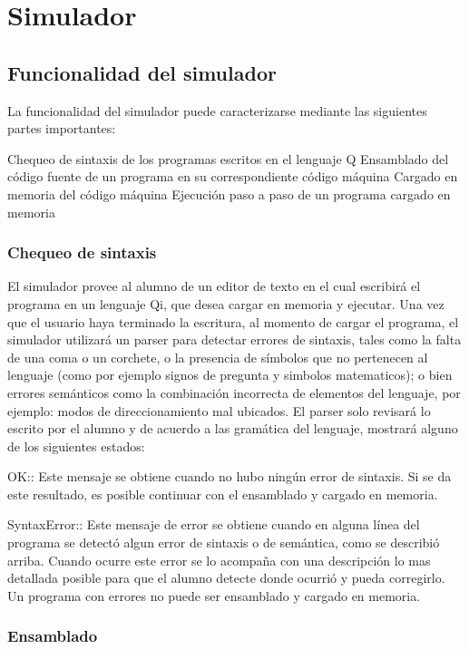 \chapter{Simulador \qsim}


\section{Funcionalidad del simulador}

La funcionalidad del simulador puede caracterizarse mediante las siguientes partes importantes:

Chequeo de sintaxis de los programas escritos en el lenguaje Q
Ensamblado del código fuente de un programa en su correspondiente código máquina
Cargado en memoria del código máquina
Ejecución paso a paso de un programa cargado en memoria

\subsection{Chequeo de sintaxis}

El simulador provee al alumno de un editor de texto en el cual escribirá el programa en un lenguaje Qi, que desea cargar en memoria y ejecutar.
Una vez que el usuario haya terminado la escritura, al momento de cargar el programa, el simulador utilizará un parser para detectar errores de sintaxis, tales como la falta de una coma o un corchete, o la presencia de símbolos que no pertenecen al lenguaje (como por ejemplo signos de pregunta y simbolos matematicos); o bien errores semánticos como la combinación incorrecta de elementos del lenguaje, por ejemplo: modos de direccionamiento mal ubicados.
El parser solo revisará lo escrito por el alumno y de acuerdo a las gramática del lenguaje, mostrará alguno de los siguientes estados:

OK:: Este mensaje se obtiene cuando no hubo ningún error de sintaxis. Si se da este resultado, es posible continuar con el ensamblado y cargado en memoria.

SyntaxError:: Este mensaje de error se obtiene cuando en alguna línea del programa se detectó algun error de sintaxis o de semántica, como se describió arriba. Cuando ocurre este error se lo acompaña con una descripción lo mas detallada posible para que el alumno detecte donde ocurrió y pueda corregirlo. Un programa con errores no puede ser ensamblado y cargado en memoria.

\subsection{Ensamblado}

